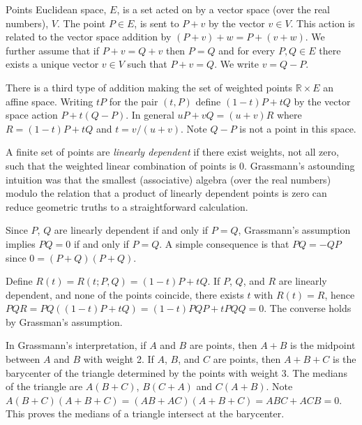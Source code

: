 \documentclass[fleqn]{amsart}
\newcommand{\RR}{\mathbb{R}}
\begin{document}
\begin{section}{Points}
Euclidean space, $E$, is a set acted on by a vector space (over the
real numbers), $V$. The point $P\in E$, is sent to $P + v$ by the vector
$v\in V$.  This action is related to the vector space addition by $(P +
v) + w = P + (v + w)$.  We further assume that if $P + v = Q + v$ then
$P = Q$ and for every $P, Q\in E$ there exists a unique vector $v\in V$
such that $P + v = Q$. We write $v = Q - P$.

There is a third type of addition making the set of weighted points
$\RR\times E$ an affine space. Writing $tP$ for the pair $(t, P)$ define
$(1 - t)P + tQ$ by the vector space action $P + t(Q - P)$.  In general $uP
+ vQ = (u + v)R$ where $R = (1 - t)P + tQ$ and $t = v/(u + v)$. Note $Q -
P$ is not a point in this space.

A finite set of points are {\em linearly dependent} if there exist
weights, not all zero, such that the weighted linear combination of
points is 0.  Grassmann's astounding intuition was that the smallest
(associative) algebra (over the real numbers) modulo the relation that a
product of linearly dependent points is zero can reduce geometric truths
to a straightforward calculation.

Since $P$, $Q$ are linearly dependent if and only if $P = Q$,
Grassmann's assumption implies $P Q = 0$ if and only if $P = Q$.
A simple consequence is that $PQ = -QP$ since
$0 = (P + Q)(P + Q)$.

Define $R(t) = R(t; P, Q) = (1 - t)P + tQ$.
If $P$, $Q$, and $R$ are linearly dependent,
and none of the points coincide, there exists $t$ with $R(t) = R$,
hence $PQR = PQ((1 - t)P + tQ) = (1 - t)PQP + t PQQ = 0$.
The converse holds by Grassman's assumption.

In Grassmann's interpretation, if $A$ and $B$ are points, then $A + B$
is the midpoint between $A$ and $B$ with weight 2.  If $A$, $B$, and $C$
are points, then $A + B + C$ is the barycenter of the triangle determined
by the points with weight 3. The medians of the triangle are $A(B + C)$,
$B(C + A)$ and $C(A + B)$.  Note $A(B + C)(A + B + C) = (AB + AC)(A +
B + C) = ABC + ACB = 0$.  This proves the medians of a triangle intersect
at the barycenter.

\end{section}
\end{document}
